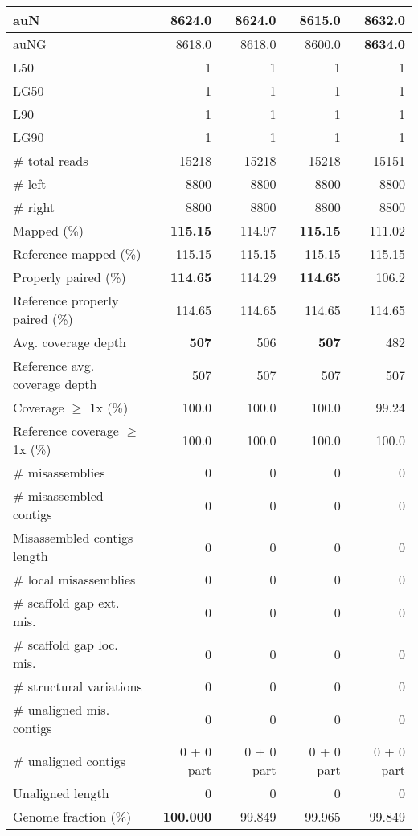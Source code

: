 \documentclass[12pt,a4paper]{article}
\begin{document}
\begin{table}[ht]
\begin{center}
\begin{tabular}{|l*{4}{|r}|}
auN & 8624.0 & 8624.0 & 8615.0 & {\bf 8632.0} \\ \hline
auNG & 8618.0 & 8618.0 & 8600.0 & {\bf 8634.0} \\ \hline
L50 & 1 & 1 & 1 & 1 \\ \hline
LG50 & 1 & 1 & 1 & 1 \\ \hline
L90 & 1 & 1 & 1 & 1 \\ \hline
LG90 & 1 & 1 & 1 & 1 \\ \hline
\# total reads & 15218 & 15218 & 15218 & 15151 \\ \hline
\# left & 8800 & 8800 & 8800 & 8800 \\ \hline
\# right & 8800 & 8800 & 8800 & 8800 \\ \hline
Mapped (\%) & {\bf 115.15} & 114.97 & {\bf 115.15} & 111.02 \\ \hline
Reference mapped (\%) & 115.15 & 115.15 & 115.15 & 115.15 \\ \hline
Properly paired (\%) & {\bf 114.65} & 114.29 & {\bf 114.65} & 106.2 \\ \hline
Reference properly paired (\%) & 114.65 & 114.65 & 114.65 & 114.65 \\ \hline
Avg. coverage depth & {\bf 507} & 506 & {\bf 507} & 482 \\ \hline
Reference avg. coverage depth & 507 & 507 & 507 & 507 \\ \hline
Coverage $\geq$ 1x (\%) & 100.0 & 100.0 & 100.0 & 99.24 \\ \hline
Reference coverage $\geq$ 1x (\%) & 100.0 & 100.0 & 100.0 & 100.0 \\ \hline
\# misassemblies & 0 & 0 & 0 & 0 \\ \hline
\# misassembled contigs & 0 & 0 & 0 & 0 \\ \hline
Misassembled contigs length & 0 & 0 & 0 & 0 \\ \hline
\# local misassemblies & 0 & 0 & 0 & 0 \\ \hline
\# scaffold gap ext. mis. & 0 & 0 & 0 & 0 \\ \hline
\# scaffold gap loc. mis. & 0 & 0 & 0 & 0 \\ \hline
\# structural variations & 0 & 0 & 0 & 0 \\ \hline
\# unaligned mis. contigs & 0 & 0 & 0 & 0 \\ \hline
\# unaligned contigs & 0 + 0 part & 0 + 0 part & 0 + 0 part & 0 + 0 part \\ \hline
Unaligned length & 0 & 0 & 0 & 0 \\ \hline
Genome fraction (\%) & {\bf 100.000} & 99.849 & 99.965 & 99.849 \\ \hline

\end{tabular}
\end{center}
\end{table}
\end{document}
